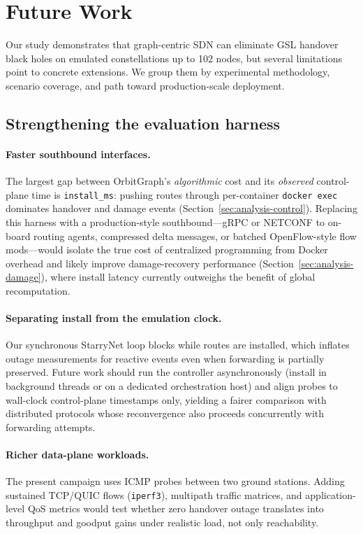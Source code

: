 
\section{Future Work}
\label{sec:future}

Our study demonstrates that graph-centric SDN can eliminate GSL handover black
holes on emulated constellations up to 102 nodes, but several limitations
point to concrete extensions.
We group them by experimental methodology, scenario coverage, and path toward
production-scale deployment.

\subsection{Strengthening the evaluation harness}

\paragraph{Faster southbound interfaces.}
The largest gap between OrbitGraph's \emph{algorithmic} cost and its
\emph{observed} control-plane time is \texttt{install\_ms}: pushing routes
through per-container \texttt{docker exec} dominates handover and damage events
(Section~\ref{sec:analysis-control}).
Replacing this harness with a production-style southbound---gRPC or NETCONF to
on-board routing agents, compressed delta messages, or batched OpenFlow-style
flow mods---would isolate the true cost of centralized programming from Docker
overhead and likely improve damage-recovery performance
(Section~\ref{sec:analysis-damage}), where install latency currently outweighs
the benefit of global recomputation.

\paragraph{Separating install from the emulation clock.}
Our synchronous StarryNet loop blocks while routes are installed, which
inflates outage measurements for reactive events even when forwarding is
partially preserved.
Future work should run the controller asynchronously (install in background
threads or on a dedicated orchestration host) and align probes to wall-clock
control-plane timestamps only, yielding a fairer comparison with distributed
protocols whose reconvergence also proceeds concurrently with forwarding
attempts.

\paragraph{Richer data-plane workloads.}
The present campaign uses ICMP probes between two ground stations.
Adding sustained TCP/QUIC flows (\texttt{iperf3}), multipath traffic matrices,
and application-level QoS metrics would test whether zero handover outage
translates into throughput and goodput gains under realistic load, not only
reachability.

